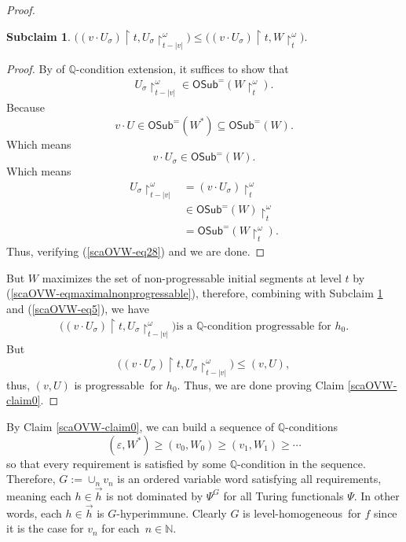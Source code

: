 \documentclass{article}
\def\uhr{\upharpoonright}
\def\vwsamelong{\mathsf{OSub}^=}
\def\sectionallymonochromatic{level-homogeneous}
\def\progressable{progressable}
\def\QQ{\mathbb{Q}}
\newcommand{\NN}[0]{\mathbb{N}}
\numberwithin{theorem}{section}
\newtheorem{subclaim}{Subclaim}[claim] %
\theoremstyle{definition}
\begin{document}
\begin{proof}
\begin{subclaim}\label{scaOVW-subclaim0}
$\big((v\cdot U_\sigma)\uhr t, U_\sigma\uhr_{t-|v|}^\omega\big)\leq
\big((v\cdot U_\sigma)\uhr t, W \uhr_t^\omega\big).$
\end{subclaim}
\begin{proof}
By  of $\QQ$-condition extension,
it suffices to show that
\begin{align}\label{scaOVW-eq28}
U_\sigma\uhr_{t-|v|}^\omega\in
\vwsamelong(W\uhr_t^\omega).
\end{align}
Because
$$v\cdot U\in \vwsamelong(W^*)\subseteq \vwsamelong(W).$$
Which means $$v\cdot U_\sigma
 \in \vwsamelong(W).$$
Which means
\begin{align}\nonumber
U_\sigma\uhr_{t-|v|}^\omega
&= (v\cdot U_\sigma)
\uhr_t^\omega\\ \nonumber
&\in \vwsamelong(W )\uhr_t^\omega \\ \nonumber
&= \vwsamelong(W\uhr_t^\omega).
\end{align}
Thus, verifying (\ref{scaOVW-eq28}) and we are done.

\end{proof}

But $W$ maximizes the set of non-progressable initial segments at level $t$
by (\ref{scaOVW-eqmaximalnonprogressable}),
therefore, combining with Subclaim \ref{scaOVW-subclaim0}
and (\ref{scaOVW-eq5}),
we have
\begin{align}\nonumber
\text{$\big((v\cdot U_\sigma)\uhr t, U_\sigma\uhr_{t-|v|}^\omega\big)$
is a  $\QQ$-condition \progressable\ for $h_0$.}
\end{align}
But $$\big((v\cdot U_\sigma)\uhr t, U_\sigma\uhr_{t-|v|}^\omega\big)\leq(v,U),$$
thus, $(v,U)$ is \progressable\ for $h_0$. Thus, we are done
proving Claim \ref{scaOVW-claim0}.


\end{proof}
By Claim \ref{scaOVW-claim0},
we can build a sequence of $\QQ$-conditions
$$(\varepsilon,W^*)\geq (v_0,W_0)\geq (v_1,W_1)\geq\cdots$$
so that every requirement is satisfied by some $\QQ$-condition in the sequence.
Therefore, $G:= \cup_n v_n$ is an ordered variable word
satisfying all requirements,
meaning each $h\in\vec{h}$ is not dominated by $\Psi^G$ for all Turing functionals $\Psi$.
In other words, each $h\in\vec{h}$ is $G$-hyperimmune.
Clearly $G$ is \sectionallymonochromatic\ for $f$
since it is the case for $v_n$ for each~$n \in \NN$.
\end{document}
